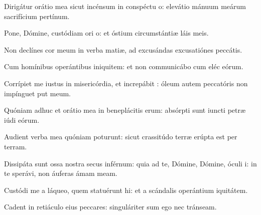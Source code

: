 \item {}

\item Dirigátur orátio mea sicut incénsum in conspéctu o:\psstar{} elevátio mánuum meárum sacrifícium pertínum.

\item Pone, Dómine, custódiam ori o:\psstar{} et óstium circumstántiæ láis meis.

\item Non declínes cor meum in verba matiæ,\psstar{} ad excusándas excusatiónes  peccátis.

\item Cum homínibus operántibus iniquitem:\psstar{} et non communicábo cum eléc eórum.

\item Corrípiet me iustus in misericórdia, et increpábit :\psstar{} óleum autem peccatóris non impínguet put meum.

\item Quóniam adhuc et orátio mea in beneplácitis erum:\psstar{} absórpti sunt iuncti petræ iúdi eórum.

\item Audient verba mea quóniam poturunt:\psstar{} sicut crassitúdo terræ erúpta est per terram.

\item Dissipáta sunt ossa nostra secus inférnum:\pscross{} quia ad te, Dómine, Dómine, óculi i:\psstar{} in te sperávi, non áuferas ámam meam.

\item Custódi me a láqueo, quem statuérunt hi:\psstar{} et a scándalis operántium iquitátem.

\item Cadent in retiáculo eius peccares:\psstar{} singuláriter sum ego nec tránseam.
